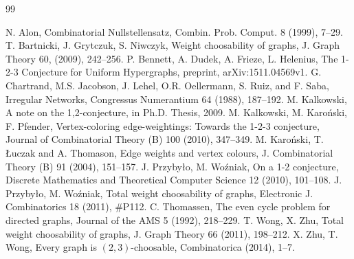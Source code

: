\documentclass[reqno,12pt,epsf]{amsart}
\begin{document}
 
 \begin{thebibliography}{99}

 N. Alon, Combinatorial Nullstellensatz, { Combin. Prob. Comput.} { 8} (1999), 7--29.  
 T. Bartnicki, J. Grytczuk, S. Niwczyk, Weight choosability of graphs, { J. Graph Theory} { 60}, (2009), 242--256.
 P. Bennett, A. Dudek, A. Frieze, L. Helenius, The 1-2-3 Conjecture for Uniform Hypergraphs, preprint, arXiv:1511.04569v1.
 G. Chartrand, M.S. Jacobson, J. Lehel, O.R.
Oellermann, S. Ruiz, and F. Saba, Irregular Networks, { Congressus
Numerantium} { 64} (1988), 187--192.
 M. Kalkowski, A note on the 1,2-conjecture, in Ph.D. Thesis, 2009.
 M. Kalkowski, M. Karo\'nski, F. Pfender, Vertex-coloring edge-weightings: Towards the 1-2-3 conjecture, {  Journal of Combinatorial Theory (B)} { 100} (2010), 347--349. 
   M. Karo\'nski, T. \L uczak and A. Thomason,  Edge weights and vertex colours,  { J. Combinatorial Theory (B)}  { 91} (2004), 151--157.
  J. Przyby{\l}o, M. Wo\'{z}niak, On a 1-2 conjecture, { Discrete Mathematics and Theoretical Computer Science} { 12} (2010), 101--108.
  J. Przyby{\l}o, M. Wo\'{z}niak, Total weight choosability of graphs, { Electronic J. Combinatorics} { 18} (2011), {\#}P112.
  C. Thomassen, The even cycle problem for directed graphs, { Journal of the AMS} { 5} (1992), 218--229.
 T. Wong, X. Zhu, Total weight choosability of graphs, { J. Graph Theory} { 66} (2011), 198--212.
 X. Zhu, T. Wong, Every graph is $(2,3)$-choosable, { Combinatorica} (2014), 1--7.
 \end{thebibliography}
\end{document}
